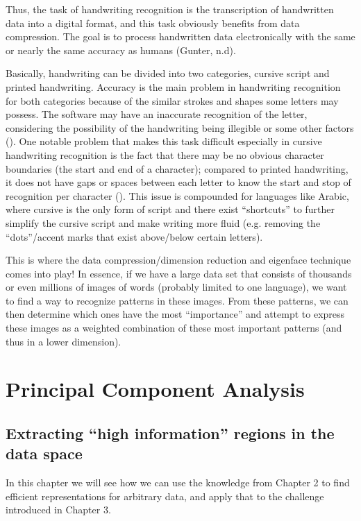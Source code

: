 \documentclass[12pt]{report}
\begin{document}
            Thus, the task of handwriting recognition is the transcription of handwritten data into a digital format, and this task obviously benefits from data compression. The goal is to process handwritten data electronically with the same or nearly the same accuracy as humans (Gunter, n.d).
            
            Basically, handwriting can be divided into two categories, cursive script and printed handwriting. Accuracy is the main problem in handwriting recognition for both categories because of the similar strokes and shapes some letters may possess. The software may have an inaccurate recognition of the letter, considering the possibility of the handwriting being illegible or some other factors (). One notable problem that makes this task difficult especially in cursive handwriting recognition is the fact that there may be no obvious character boundaries (the start and end of a character); compared to printed handwriting, it does not have gaps or spaces between each letter to know the start and stop of recognition per character (). This issue is compounded for languages like Arabic, where cursive is the only form of script and there exist ``shortcuts'' to further simplify the cursive script and make writing more fluid (e.g. removing the ``dots''/accent marks that exist above/below certain letters).
            
            This is where the data compression/dimension reduction and eigenface technique comes into play! In essence, if we have a large data set that consists of thousands or even millions of images of words (probably limited to one language), we want to find a way to recognize patterns in these images. From these patterns, we can then determine which ones have the most ``importance'' and attempt to express these images as a weighted combination of these most important patterns (and thus in a lower dimension).
        
    
    \chapter{Principal Component Analysis}
        \section{Extracting ``high information'' regions in the data space}
            In this chapter we will see how we can use the knowledge from Chapter 2 to find efficient representations for arbitrary data, and apply that to the challenge introduced in Chapter 3.
\end{document}

